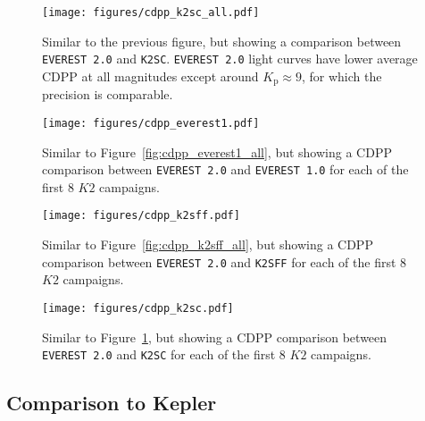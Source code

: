\documentclass[]{emulateapj}
\newcommand{\Kp}{\ensuremath{K_\mathrm{p}}}
\begin{document}
\begin{figure}[ht]
  \begin{center}
      \texttt{[image: figures/cdpp\_k2sc\_all.pdf]}
       \caption{Similar to the previous figure, but showing a comparison between \texttt{EVEREST 2.0} and \texttt{K2SC}.
       \texttt{EVEREST 2.0} light curves have lower average CDPP at all magnitudes except around $\Kp \approx 9$, for which
       the precision is comparable.}
     \label{fig:cdpp_k2sc_all}
  \end{center}
\end{figure}

\begin{figure}[ht]
  \begin{center}
      \texttt{[image: figures/cdpp\_everest1.pdf]}
       \caption{Similar to Figure~\ref{fig:cdpp_everest1_all}, but showing a CDPP comparison between 
       \texttt{EVEREST 2.0} and \texttt{EVEREST 1.0} for each of the first 8 $K2$ campaigns.}
     \label{fig:cdpp_everest1}
  \end{center}
\end{figure}

\begin{figure}[ht]
  \begin{center}
      \texttt{[image: figures/cdpp\_k2sff.pdf]}
       \caption{Similar to Figure~\ref{fig:cdpp_k2sff_all}, but showing a CDPP comparison between 
       \texttt{EVEREST 2.0} and \texttt{K2SFF} for each of the first 8 $K2$ campaigns.}
     \label{fig:cdpp_k2sff}
  \end{center}
\end{figure}

\begin{figure}[ht]
  \begin{center}
      \texttt{[image: figures/cdpp\_k2sc.pdf]}
       \caption{Similar to Figure~\ref{fig:cdpp_k2sc_all}, but showing a CDPP comparison between 
       \texttt{EVEREST 2.0} and \texttt{K2SC} for each of the first 8 $K2$ campaigns.}
     \label{fig:cdpp_k2sc}
  \end{center}
\end{figure}

\subsection{Comparison to Kepler}
\end{document}

